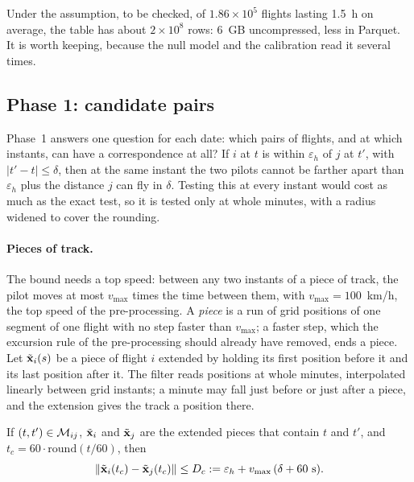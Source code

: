Under the assumption, to be checked, of $1.86\times10^5$ flights lasting 1.5~h on average, the
table has about $2\times10^8$ rows: 6~GB uncompressed, less in Parquet. It is worth keeping,
because the null model and the calibration read it several times.

\subsection{Phase 1: candidate pairs}\label{sec:phase1}

Phase~1 answers one question for each date: which pairs of flights, and at which instants, can
have a correspondence at all? If $i$ at $t$ is within $\varepsilon_h$ of $j$ at $t'$, with
$|t'-t|\le\delta$, then at the same instant the two pilots cannot be farther apart than
$\varepsilon_h$ plus the distance $j$ can fly in $\delta$. Testing this at every instant would
cost as much as the exact test, so it is tested only at whole minutes, with a radius widened to
cover the rounding.

\paragraph{Pieces of track.} The bound needs a top speed: between any two instants of a piece of
track, the pilot moves at most $v_{\max}$ times the time between them, with $v_{\max}=100$~km/h,
the top speed of the pre-processing. A \emph{piece} is a run of grid positions of one segment of
one flight with no step faster than $v_{\max}$; a faster step, which the excursion rule of the
pre-processing should already have removed, ends a piece. Let $\tilde{\mathbf{x}}_i(s)$ be a piece of
flight $i$ extended by holding its first position before it and its last position after it. The
filter reads positions at whole minutes, interpolated linearly between grid instants; a minute
may fall just before or just after a piece, and the extension gives the track a position there.

\begin{lemma}\label{lem:filter}
If $(t,t')\in\mathcal{M}_{ij}$, $\tilde{\mathbf{x}}_i$ and $\tilde{\mathbf{x}}_j$ are the extended pieces that contain $t$
and $t'$, and $t_c=60\cdot\mathrm{round}(t/60)$, then
\begin{equation}\label{eq:filter}
  \|\tilde{\mathbf{x}}_i(t_c)-\tilde{\mathbf{x}}_j(t_c)\| \le D_c := \varepsilon_h+v_{\max}\,(\delta+60~\mathrm{s}).
\end{equation}
\end{lemma}

